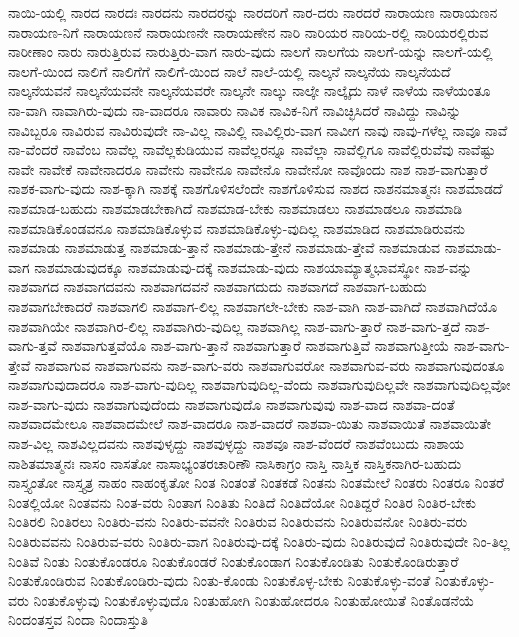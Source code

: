 {ನಾಯಿ-ಯಲ್ಲಿ
ನಾರದ
ನಾರದಃ
ನಾರದನು
ನಾರದರನ್ನು
ನಾರದರಿಗೆ
ನಾರ-ದರು
ನಾರದರೆ
ನಾರಾಯಣ
ನಾರಾಯಣನ
ನಾರಾಯಣ-ನಿಗೆ
ನಾರಾಯಣನೆ
ನಾರಾಯಣನೇ
ನಾರಾಯಣೇನ
ನಾರಿ
ನಾರಿಯರ
ನಾರಿಯ-ರಲ್ಲಿ
ನಾರಿಯರಲ್ಲಿರುವ
ನಾರೀಣಾಂ
ನಾರು
ನಾರುತ್ತಿರುವ
ನಾರುತ್ತಿರು-ವಾಗ
ನಾರು-ವುದು
ನಾಲಗೆ
ನಾಲಗೆಯ
ನಾಲಗೆ-ಯನ್ನು
ನಾಲಗೆ-ಯಲ್ಲಿ
ನಾಲಗೆ-ಯಿಂದ
ನಾಲಿಗೆ
ನಾಲಿಗೆಗೆ
ನಾಲಿಗೆ-ಯಿಂದ
ನಾಲೆ
ನಾಲೆ-ಯಲ್ಲಿ
ನಾಲ್ಕನೆ
ನಾಲ್ಕನೆಯ
ನಾಲ್ಕನೆಯದೆ
ನಾಲ್ಕನೆಯವನೆ
ನಾಲ್ಕನೆಯವನೇ
ನಾಲ್ಕನೆಯವರೇ
ನಾಲ್ಕನೇ
ನಾಲ್ಕು
ನಾಲ್ಕೇ
ನಾಲ್ಕೈದು
ನಾಳೆ
ನಾಳೆಯ
ನಾಳೆಯಂತೂ
ನಾ-ವಾಗಿ
ನಾವಾಗಿರು-ವುದು
ನಾ-ವಾದರೂ
ನಾವಾರು
ನಾವಿಕ
ನಾವಿಕ-ನಿಗೆ
ನಾವಿಚ್ಛಿಸಿದರೆ
ನಾವಿದ್ದು
ನಾವಿನ್ನು
ನಾವಿಬ್ಬರೂ
ನಾವಿರುವ
ನಾವಿರುವುದೇ
ನಾ-ವಿಲ್ಲ
ನಾವಿಲ್ಲಿ
ನಾವಿಲ್ಲಿರು-ವಾಗ
ನಾವೀಗ
ನಾವು
ನಾವು-ಗಳೆಲ್ಲ
ನಾವೂ
ನಾವೆ
ನಾ-ವೆಂದರೆ
ನಾವೆಂಬ
ನಾವೆಲ್ಲ
ನಾವೆಲ್ಲಕುಡಿಯುವ
ನಾವೆಲ್ಲರನ್ನೂ
ನಾವೆಲ್ಲಾ
ನಾವೆಲ್ಲಿಗೂ
ನಾವೆಲ್ಲಿರುವೆವು
ನಾವೆಷ್ಟು
ನಾವೇ
ನಾವೇಕೆ
ನಾವೇನಾದರೂ
ನಾವೇನು
ನಾವೇನೂ
ನಾವೇನೊ
ನಾವೇನೋ
ನಾವೊಂದು
ನಾಶ
ನಾಶ-ವಾಗುತ್ತಾರೆ
ನಾಶಕ-ವಾಗು-ವುದು
ನಾಶ-ಕ್ಕಾಗಿ
ನಾಶಕ್ಕೆ
ನಾಶಗೊಳಿಸಲೆಂದೇ
ನಾಶಗೊಳಿಸುವ
ನಾಶದ
ನಾಶನಮಾತ್ಮನಃ
ನಾಶಮಾಡದೆ
ನಾಶಮಾಡ-ಬಹುದು
ನಾಶಮಾಡಬೇಕಾಗಿದೆ
ನಾಶಮಾಡ-ಬೇಕು
ನಾಶಮಾಡಲು
ನಾಶಮಾಡಲೂ
ನಾಶಮಾಡಿ
ನಾಶಮಾಡಿಕೊಂಡವನೂ
ನಾಶಮಾಡಿಕೊಳ್ಳುವ
ನಾಶಮಾಡಿಕೊಳ್ಳು-ವುದಿಲ್ಲ
ನಾಶಮಾಡಿದ
ನಾಶಮಾಡಿರುವನು
ನಾಶಮಾಡು
ನಾಶಮಾಡುತ್ತ
ನಾಶಮಾಡು-ತ್ತಾನೆ
ನಾಶಮಾಡು-ತ್ತೇನೆ
ನಾಶಮಾಡು-ತ್ತೇವೆ
ನಾಶಮಾಡುವ
ನಾಶಮಾಡು-ವಾಗ
ನಾಶಮಾಡುವುದಕ್ಕೂ
ನಾಶಮಾಡುವು-ದಕ್ಕೆ
ನಾಶಮಾಡು-ವುದು
ನಾಶಯಾಮ್ಯಾತ್ಮಭಾವಸ್ಥೋ
ನಾಶ-ವನ್ನು
ನಾಶವಾಗದ
ನಾಶವಾಗದವನು
ನಾಶವಾಗದವನೆ
ನಾಶವಾಗದುದು
ನಾಶವಾಗದೆ
ನಾಶವಾಗ-ಬಹುದು
ನಾಶವಾಗಬೇಕಾದರೆ
ನಾಶವಾಗಲಿ
ನಾಶವಾಗ-ಲಿಲ್ಲ
ನಾಶವಾಗಲೇ-ಬೇಕು
ನಾಶ-ವಾಗಿ
ನಾಶ-ವಾಗಿದೆ
ನಾಶವಾಗಿದೆಯೊ
ನಾಶವಾಗಿಯೇ
ನಾಶವಾಗಿರ-ಲಿಲ್ಲ
ನಾಶವಾಗಿರು-ವುದಿಲ್ಲ
ನಾಶವಾಗಿಲ್ಲ
ನಾಶ-ವಾಗು-ತ್ತಾರೆ
ನಾಶ-ವಾಗು-ತ್ತದೆ
ನಾಶ-ವಾಗು-ತ್ತವೆ
ನಾಶವಾಗುತ್ತವೆಯೊ
ನಾಶ-ವಾಗು-ತ್ತಾನೆ
ನಾಶವಾಗುತ್ತಾರೆ
ನಾಶವಾಗುತ್ತಿವೆ
ನಾಶವಾಗುತ್ತೀಯೆ
ನಾಶ-ವಾಗು-ತ್ತೇವೆ
ನಾಶವಾಗುವ
ನಾಶವಾಗುವನು
ನಾಶ-ವಾಗು-ವರು
ನಾಶವಾಗುವರೋ
ನಾಶವಾಗುವ-ವರು
ನಾಶವಾಗುವುದಂತೂ
ನಾಶವಾಗುವುದಾದರೂ
ನಾಶ-ವಾಗು-ವುದಿಲ್ಲ
ನಾಶವಾಗುವುದಿಲ್ಲ-ವೆಂದು
ನಾಶವಾಗುವುದಿಲ್ಲವೇ
ನಾಶವಾಗುವುದಿಲ್ಲವೋ
ನಾಶ-ವಾಗು-ವುದು
ನಾಶವಾಗುವುದೆಂದು
ನಾಶವಾಗುವುದೊ
ನಾಶವಾಗುವುವು
ನಾಶ-ವಾದ
ನಾಶವಾ-ದಂತೆ
ನಾಶವಾದಮೇಲೂ
ನಾಶವಾದಮೇಲೆ
ನಾಶ-ವಾದರೂ
ನಾಶ-ವಾದರೆ
ನಾಶವಾ-ಯಿತು
ನಾಶವಾಯಿತೆ
ನಾಶವಾಯಿತೇ
ನಾಶ-ವಿಲ್ಲ
ನಾಶವಿಲ್ಲದವನು
ನಾಶವುಳೃದ್ದು
ನಾಶವುಳ್ಳದ್ದು
ನಾಶವೂ
ನಾಶ-ವೆಂದರೆ
ನಾಶವೆಂಬುದು
ನಾಶಾಯ
ನಾಶಿತಮಾತ್ಮನಃ
ನಾಸಂ
ನಾಸತೋ
ನಾಸಾಭ್ಯಂತರಚಾರಿಣೌ
ನಾಸಿಕಾಗ್ರಂ
ನಾಸ್ತಿ
ನಾಸ್ತಿಕ
ನಾಸ್ತಿಕನಾಗಿರ-ಬಹುದು
ನಾಸ್ತ್ಯಂತೋ
ನಾಸ್ತ್ಯತ್ರ
ನಾಹಂ
ನಾಹಂಕೃತೋ
ನಿಂತ
ನಿಂತಂತೆ
ನಿಂತಕಡೆ
ನಿಂತನು
ನಿಂತಮೇಲೆ
ನಿಂತರು
ನಿಂತರೂ
ನಿಂತರೆ
ನಿಂತಲ್ಲಿಯೋ
ನಿಂತವನು
ನಿಂತ-ವರು
ನಿಂತಾಗ
ನಿಂತಿತು
ನಿಂತಿದೆ
ನಿಂತಿದೆಯೋ
ನಿಂತಿದ್ದರೆ
ನಿಂತಿರ
ನಿಂತಿರ-ಬೇಕು
ನಿಂತಿರಲಿ
ನಿಂತಿರಲು
ನಿಂತಿರು-ವನು
ನಿಂತಿರು-ವವನೇ
ನಿಂತಿರುವ
ನಿಂತಿರುವನು
ನಿಂತಿರುವನೋ
ನಿಂತಿರು-ವರು
ನಿಂತಿರುವವನು
ನಿಂತಿರುವ-ವರು
ನಿಂತಿರು-ವಾಗ
ನಿಂತಿರುವು-ದಕ್ಕೆ
ನಿಂತಿರು-ವುದು
ನಿಂತಿರುವುದೆ
ನಿಂತಿರುವುದೇ
ನಿಂ-ತಿಲ್ಲ
ನಿಂತಿವೆ
ನಿಂತು
ನಿಂತುಕೊಂಡರೂ
ನಿಂತುಕೊಂಡರೆ
ನಿಂತುಕೊಂಡಾಗ
ನಿಂತುಕೊಂಡಿತು
ನಿಂತುಕೊಂಡಿರುತ್ತಾರೆ
ನಿಂತುಕೊಂಡಿರುವ
ನಿಂತುಕೊಂಡಿರು-ವುದು
ನಿಂತು-ಕೊಂಡು
ನಿಂತುಕೊಳ್ಳ-ಬೇಕು
ನಿಂತುಕೊಳ್ಳು-ವಂತೆ
ನಿಂತುಕೊಳ್ಳು-ವರು
ನಿಂತುಕೊಳ್ಳುವು
ನಿಂತುಕೊಳ್ಳುವುದೊ
ನಿಂತುಹೋಗಿ
ನಿಂತುಹೋದರೂ
ನಿಂತುಹೋಯಿತೆ
ನಿಂತೊಡನೆಯೆ
ನಿಂದಂತಸ್ತವ
ನಿಂದಾ
ನಿಂದಾಸ್ತುತಿ
}
